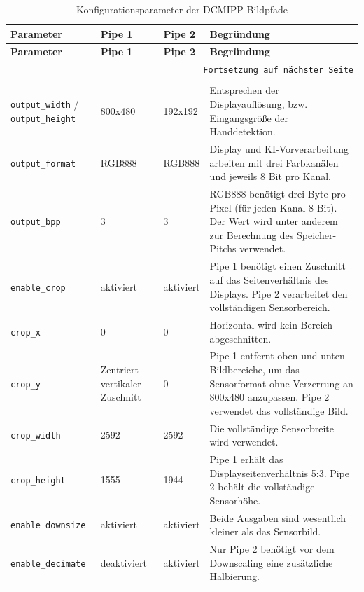 \begin{longtable}{|p{}|p{}|p{}|p{}|}
    \hline
    \textbf{Parameter} & \textbf{Pipe 1} & \textbf{Pipe 2} & \textbf{Begründung} \\
    \hline
    \endfirsthead
    \hline
    \textbf{Parameter} & \textbf{Pipe 1} & \textbf{Pipe 2} & \textbf{Begründung} \\
    \hline
    \endhead
    \hline
    \multicolumn{4}{r}{\texttt{Fortsetzung auf nächster Seite}} \\
    \endfoot
    \caption{Konfigurationsparameter der DCMIPP-Bildpfade}
    \label{tab:dcmipp-konfig} \\
    \endlastfoot
    \texttt{output\_width} / \texttt{output\_height} & 800x480 & 192x192 & Entsprechen der Displayauflösung, bzw. Eingangsgröße der Handdetektion. \\
    \hline
    \texttt{output\_format} & RGB888 & RGB888 & Display und KI-Vorverarbeitung arbeiten mit drei Farbkanälen und jeweils 8 Bit pro Kanal. \\
    \hline
    \texttt{output\_bpp} & 3 & 3 & RGB888 benötigt drei Byte pro Pixel (für jeden Kanal 8 Bit). Der Wert wird unter anderem zur Berechnung des Speicher-Pitchs verwendet. \\
    \hline
    \texttt{enable\_crop} & aktiviert & aktiviert & Pipe 1 benötigt einen Zuschnitt auf das Seitenverhältnis des Displays. Pipe 2 verarbeitet den vollständigen Sensorbereich. \\
    \hline
    \texttt{crop\_x} & 0 & 0 & Horizontal wird kein Bereich abgeschnitten. \\
    \hline
    \texttt{crop\_y} & Zentriert vertikaler Zuschnitt & 0 & Pipe 1 entfernt oben und unten Bildbereiche, um das Sensorformat ohne Verzerrung an 800x480 anzupassen. Pipe 2 verwendet das vollständige Bild. \\
    \hline
    \texttt{crop\_width} & 2592 & 2592 & Die vollständige Sensorbreite wird verwendet. \\
    \hline
    \texttt{crop\_height} & 1555 & 1944 & Pipe 1 erhält das Displayseitenverhältnis 5:3. Pipe 2 behält die vollständige Sensorhöhe. \\
    \hline
    \texttt{enable\_\linebreak downsize} & aktiviert & aktiviert & Beide Ausgaben sind wesentlich kleiner als das Sensorbild. \\
    \hline
    \texttt{enable\_\linebreak decimate} & deaktiviert & aktiviert & Nur Pipe 2 benötigt vor dem Downscaling eine zusätzliche Halbierung. \\

\end{longtable}
